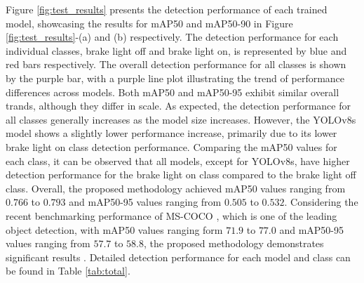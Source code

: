 Figure \ref{fig:test_results} presents the detection performance of each trained model, showcasing the results for mAP50 and mAP50-90 in Figure \ref{fig:test_results}-(a) and (b) respectively.
The detection performance for each individual classes, brake light off and brake light on, is represented by blue and red bars respectively. 
The overall detection performance for all classes is shown by the purple bar, with a purple line plot illustrating the trend of performance differences across models.
Both mAP50 and mAP50-95 exhibit similar overall trands, although they differ in scale.
As expected, the detection performance for all classes generally increases as the model size increases.
However, the YOLOv8s model shows a slightly lower performance increase, primarily due to its lower brake light on class detection performance.
Comparing the mAP50 values for each class, it can be observed that all models, except for YOLOv8s, have higher detection performance for the brake light on class compared to the brake light off class.
Overall, the proposed methodology achieved mAP50 values ranging from $0.766$ to $0.793$ and mAP50-95 values ranging from $0.505$ to $0.532$.
Considering the recent benchmarking performance of MS-COCO \cite{lin2014microsoft}, which is one of the leading object detection, with mAP50 values ranging form $71.9$ to $77.0$ and mAP50-95 values ranging from $57.7$ to $58.8$, the proposed methodology demonstrates significant results \cite{coco_benchmark, zou2023object}.
Detailed detection performance for each model and class can be found in Table \ref{tab:total}.


